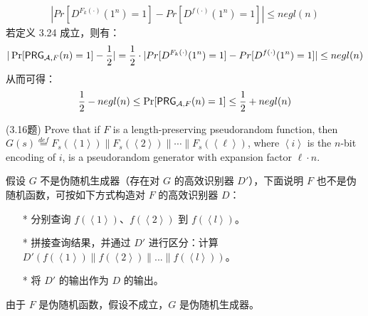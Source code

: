 \begin{questions}
\begin{solution}
\begin{equation}
\begin{aligned}
                    |Pr[D^{F_k(\cdot)}(1^n)=1]-Pr[D^{f(\cdot)}(1^n)=1]|\leq{negl}(n)
                \end{aligned}
            \end{equation}
            若定义 3.24 成立，则有：
            \begin{equation}
                \begin{aligned}
                    |\Pr[\mathsf{PRG}_{\mathcal{A},F}(n)=1]-\frac{1}{2}|=\frac{1}{2}\cdot|Pr[D^{F_k(\cdot)}(1^n)=1]-Pr[D^{f(\cdot)}(1^n)=1]|\leq{negl}(n)
                \end{aligned}
            \end{equation}
            从而可得：
            \begin{equation}
                \begin{aligned}
                    \frac{1}{2}-negl(n)\leq\Pr[\mathsf{PRG}_{\mathcal{A},F}(n)=1]\leq\frac{1}{2}+negl(n)
                \end{aligned}
            \end{equation}
        \end{solution}

    \question (3.16题) Prove that if $F$ is a length-preserving pseudorandom function, then $G(s)\overset{def}{=}F_s(\left\langle1\right\rangle)\parallel{F_s}(\left\langle2\right\rangle)\parallel\cdots\parallel{F_s}(\left\langle\ell\right\rangle)$, where $\left\langle{i}\right\rangle$ is the $n$-bit encoding of $i$, is a pseudorandom generator with expansion factor $\ell\cdot{n}$.

        \begin{solution}
            \newline
            假设 $G$ 不是伪随机生成器（存在对 $G$ 的高效识别器 $D'$），下面说明 $F$ 也不是伪随机函数，可按如下方式构造对 $F$ 的高效识别器 $D$：
                \begin{enumerate}
                    \item[*] 分别查询 $f(\left\langle1\right\rangle)$、$f(\left\langle2\right\rangle)$ 到 $f(\left\langle{l}\right\rangle)$。
                    \item[*] 拼接查询结果，并通过 $D'$ 进行区分：计算 $D'(f(\left\langle1\right\rangle)\parallel{f}(\left\langle2\right\rangle)\parallel...\parallel{f}(\left\langle{l}\right\rangle))$。
                    \item[*] 将 $D'$ 的输出作为 $D$ 的输出。
                \end{enumerate}
                由于 $F$ 是伪随机函数，假设不成立，$G$ 是伪随机生成器。
        \end{solution}


\end{questions}
